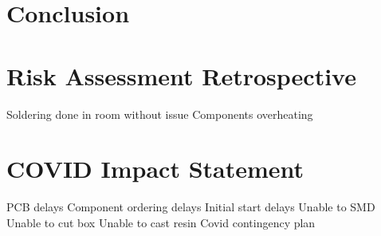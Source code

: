 \documentclass{IIBproject}
\begin{document}




\section{Conclusion}





\newpage




\newpage
\appendix
\appendixpage
\addappheadtotoc

\section{Risk Assessment Retrospective}
Soldering done in room without issue
Components overheating

\section{COVID Impact Statement}
PCB delays
Component ordering delays
Initial start delays
Unable to SMD
Unable to cut box
Unable to cast resin
Covid contingency plan
\end{document}
